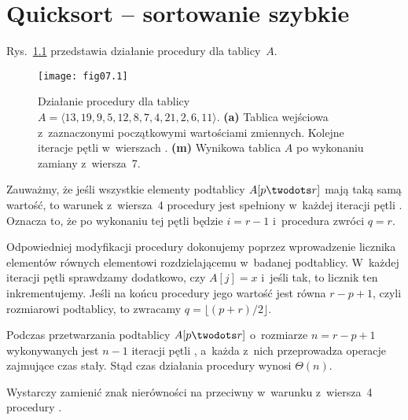 \chapter{Quicksort -- sortowanie szybkie}


\exercise %

\noindent Rys.~\ref{fig:7.1-1} przedstawia działanie procedury  dla tablicy~$A$.
\begin{figure}[ht]
	\begin{center}
		\texttt{[image: fig07.1]}
	\end{center}
	\caption{Działanie procedury  dla tablicy $A=\langle13,19,9,5,12,8,7,4,21,2,6,11\rangle$. {\sffamily\bfseries(a)} Tablica wejściowa z~zaznaczonymi początkowymi wartościami zmiennych. {\sffamily\bfseries{}} Kolejne iteracje pętli  w~wierszach . {\sffamily\bfseries(m)} Wynikowa tablica $A$ po wykonaniu zamiany z~wiersza~7.} \label{fig:7.1-1}
\end{figure}

\exercise %

\noindent Zauważmy, że jeśli wszystkie elementy podtablicy $A[p\twodots r]$ mają taką samą wartość, to warunek z~wiersza~4 procedury  jest spełniony w~każdej iteracji pętli . Oznacza to, że po wykonaniu tej pętli będzie $i=r-1$ i~procedura zwróci $q=r$.

Odpowiedniej modyfikacji procedury dokonujemy poprzez wprowadzenie licznika elementów równych elementowi rozdzielającemu w~badanej podtablicy. W~każdej iteracji pętli  sprawdzamy dodatkowo, czy $A[j]=x$ i~jeśli tak, to licznik ten inkrementujemy. Jeśli na końcu procedury jego wartość jest równa $r-p+1$, czyli rozmiarowi podtablicy, to zwracamy $q=\lfloor(p+r)/2\rfloor$.

\exercise %
Podczas przetwarzania podtablicy $A[p\twodots r]$ o~rozmiarze $n=r-p+1$ wykonywanych jest $n-1$ iteracji pętli , a~każda z~nich przeprowadza operacje zajmujące czas stały. Stąd czas działania procedury  wynosi $\Theta(n)$.

\exercise %
Wystarczy zamienić znak nierówności na przeciwny w~warunku z~wiersza~4 procedury .


